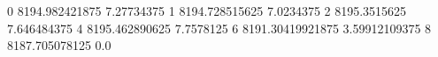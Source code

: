 0 8194.982421875 7.27734375
1 8194.728515625 7.0234375
2 8195.3515625 7.646484375
4 8195.462890625 7.7578125
6 8191.30419921875 3.59912109375
8 8187.705078125 0.0
